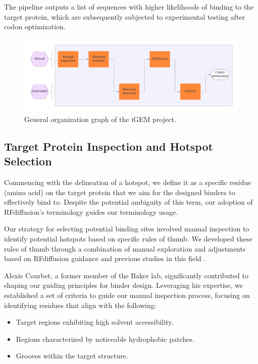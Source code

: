 \documentclass[11pt,a4paper]{article}
\begin{document}
The pipeline outputs a list of sequences with higher likelihoods of binding to the target protein, which are subsequently subjected to experimental testing after codon optimization.

\begin{figure}[ht]
    \centering
    \label{fig:organization_graph}
    \includegraphics[width=\textwidth]{Figures/iGEM_project_general_organization_graph.pdf}
    \caption{General organization graph of the iGEM project.}
\end{figure}

\subsection{Target Protein Inspection and Hotspot Selection}

Commencing with the delineation of a hotspot, we define it as a specific residue (amino acid) on the target protein that we aim for the designed binders to effectively bind to. Despite the potential ambiguity of this term, our adoption of RFdiffusion's terminology guides our terminology usage.

Our strategy for selecting potential binding sites involved manual inspection to identify potential hotspots based on specific rules of thumb. We developed these rules of thumb through a combination of manual exploration and adjustments based on RFdiffusion guidance \cite{rfdiffusion_github} and previous studies in this field \cite{chen2013protein}.

Alexis Courbet, a former member of the Baker lab, significantly contributed to shaping our guiding principles for binder design. Leveraging his expertise, we established a set of criteria to guide our manual inspection process, focusing on identifying residues that align with the following:

\begin{itemize}
\item Target regions exhibiting high solvent accessibility.
\item Regions characterized by noticeable hydrophobic patches.
\item Grooves within the target structure.
\end{itemize}
\end{document}

